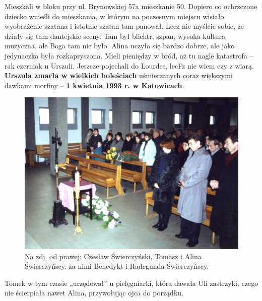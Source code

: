 Mieszkali w bloku przy ul. Brynowskiej 57a mieszkanie 50. Dopiero co ochrzczone dziecko wnieśli do mieszkania, w którym na poczesnym miejscu wisiało wyobrażenie szatana i istotnie szatan tam panował. Lecz nie myślcie sobie, że działy się tam dantejskie sceny. Tam był blichtr, szpan, wysoka kultura muzyczna, ale Boga tam nie było. Alina uczyła się bardzo dobrze, ale jako jedynaczka była rozkapryszona. Mieli pieniędzy w bród, aż tu nagle katastrofa – rak czerniak u Urszuli. Jeszcze pojechali do Lourdes, lecFz nie wiem czy z wiarą. \textbf{Urszula zmarła w wielkich boleściach} uśmierzanych coraz większymi dawkami morfiny – \textbf{1 kwietnia 1993 r. w Katowicach}.
\begin{figure}[!h]
\begin{center}
\includegraphics[width=\textwidth]{photo/urszula_swierczynska_pogrzeb.jpg}
\caption[Pogrzeb Urszuli Świerczyńskiej]{Na zdj. od prawej: Czesław Świerczyński, Tomasz i Alina Świerczyńscy, za nimi Benedykt i Radegunda Świerczyńscy.}
\end{center}
\end{figure}

Tomek w tym czasie „urzędował” u pielęgniarki, która dawała Uli zastrzyki, czego nie ścierpiała nawet Alina, przywołując ojca do porządku.

